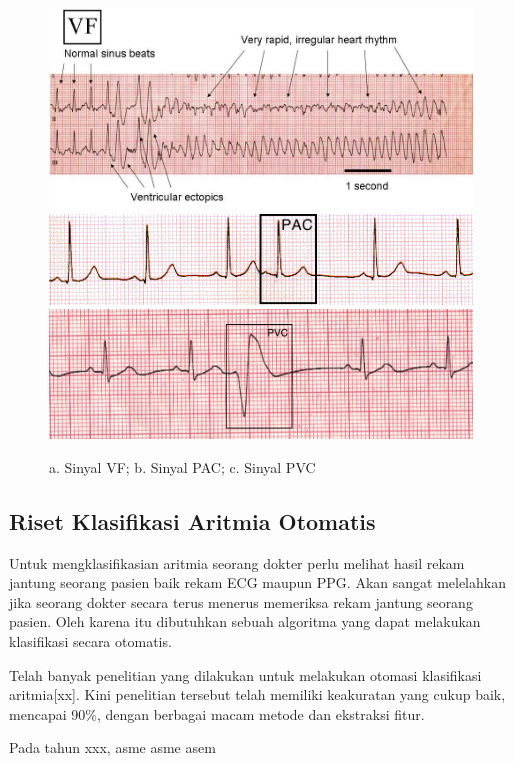 \begin{figure}[H]
    \centering
	\includegraphics[scale=1.2]{images/VF.jpg}
    \includegraphics[scale=0.5]{images/PAC1.png}
	\includegraphics[scale=0.25]{images/PVC1.png}
    \caption{a. Sinyal VF; b. Sinyal PAC; c. Sinyal PVC}
    \label{fig:contoh_aritmia}
\end{figure}

\subsection{Riset Klasifikasi Aritmia Otomatis}
Untuk mengklasifikasian aritmia seorang dokter perlu melihat hasil rekam jantung seorang pasien baik rekam ECG maupun PPG. Akan sangat melelahkan jika seorang dokter secara terus menerus memeriksa rekam jantung seorang pasien. Oleh karena itu dibutuhkan sebuah algoritma yang dapat melakukan klasifikasi secara otomatis. 

Telah banyak penelitian yang dilakukan untuk melakukan otomasi klasifikasi aritmia[xx]. Kini penelitian tersebut telah memiliki keakuratan yang cukup baik, mencapai 90\%, dengan berbagai macam metode dan ekstraksi fitur.

Pada tahun xxx, asme asme asem

